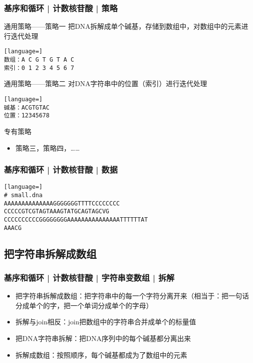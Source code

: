 \begin{frame}[fragile]
  \frametitle{基序和循环 | 计数核苷酸 | 策略}
  \begin{block}{通用策略——策略一}
    把DNA拆解成单个碱基，存储到数组中，对数组中的元素进行迭代处理
\begin{lstlisting}[language=]
数组：A C G T G T A C
索引：0 1 2 3 4 5 6 7
\end{lstlisting}
  \vspace{-0.5em}
  \end{block}
  \pause
  \vspace{-0.5em}
  \begin{block}{通用策略——策略二}
    对DNA字符串中的位置（索引）进行迭代处理
  \vspace{-0.5em}
\begin{lstlisting}[language=]
碱基：ACGTGTAC
位置：12345678
\end{lstlisting}
  \vspace{-0.5em}
  \end{block}
  \pause
  \vspace{-0.5em}
  \begin{block}{专有策略}
    \begin{itemize}
      \item 策略三，策略四，……
    \end{itemize}
  \end{block}
\end{frame}

\begin{frame}[fragile]
  \frametitle{基序和循环 | 计数核苷酸 | 数据}
\begin{lstlisting}[language=]
# small.dna
AAAAAAAAAAAAAAGGGGGGGTTTTCCCCCCCC
CCCCCGTCGTAGTAAAGTATGCAGTAGCVG
CCCCCCCCCCGGGGGGGGAAAAAAAAAAAAAAATTTTTTAT
AAACG
\end{lstlisting}
\end{frame}

\subsection{把字符串拆解成数组}
\begin{frame}
  \frametitle{基序和循环 | 计数核苷酸 | 字符串变数组 | 拆解}
  \begin{itemize}
    \item 把字符串拆解成数组：把字符串中的每一个字符分离开来（相当于：把一句话分成单个的字，把一个单词分成单个的字母）
    \item 拆解与join相反：join把数组中的字符串合并成单个的标量值
    \item 把DNA字符串拆解：把DNA序列中的每个碱基都分离出来
    \item 拆解成数组：按照顺序，每个碱基都成为了数组中的元素
  \end{itemize}
\end{frame}

